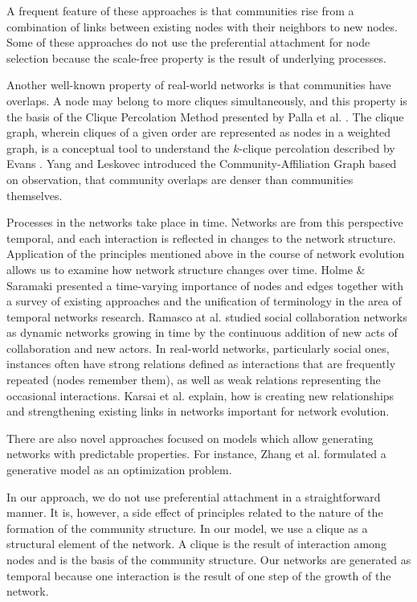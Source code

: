 \documentclass{sig-alternate-05-2015}
\begin{document}
A frequent feature of these approaches is that communities rise from a combination of links between existing nodes with their neighbors to new nodes. Some of these approaches do not use the preferential attachment for node selection because the scale-free property is the result of underlying processes.

Another well-known property of real-world networks is that communities have overlaps.
A node may belong to more cliques simultaneously, and this property is the basis of the Clique Percolation Method presented by Palla et al. \cite{palla2005uncovering}.
The clique graph, wherein cliques of a given order are represented as nodes in a weighted graph, is a conceptual tool to understand the $k$-clique percolation described by Evans \cite{evans2010clique}.
Yang and Leskovec introduced the Community-Affiliation Graph \cite{yang2012community} based on observation, that community overlaps are denser than communities themselves. 

Processes in the networks take place in time. Networks are from this perspective temporal, and each interaction is reflected in changes to the network structure. Application of the principles mentioned above in the course of network evolution allows us to examine how network structure changes over time. 
Holme \& Saramaki \cite{holme2012temporal} presented a time-varying importance of nodes and edges together with a survey of existing approaches and the unification of terminology in the area of temporal networks research.
Ramasco at al. \cite{ramasco2004self} studied social collaboration networks as dynamic networks growing in time by the continuous addition of new acts of collaboration and new actors.
In real-world networks, particularly social ones, instances often have strong relations defined as interactions that are frequently repeated (nodes remember them), as well as weak relations representing the occasional interactions. Karsai et al. \cite{karsai2014time} explain, how is creating new relationships and strengthening existing links in networks important for network evolution. 

There are also novel approaches focused on models which allow generating networks with predictable properties. For instance, Zhang et al. \cite{zheng2014simple} formulated a generative model as an optimization problem.

In our approach, we do not use preferential attachment in a straightforward manner. It is, however, a side effect of principles related to the nature of the formation of the community structure. In our model, we use a clique as a structural element of the network. A clique is the result of interaction among nodes and is the basis of the community structure. Our networks are generated as temporal because one interaction is the result of one step of the growth of the network.
\end{document}
